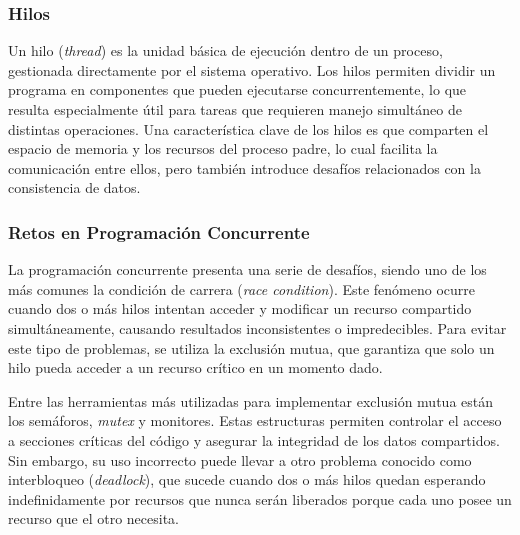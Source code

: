 \subsubsection{Hilos}
Un hilo (\textit{thread}) es la unidad básica de ejecución dentro de un proceso, gestionada directamente por el sistema operativo. Los hilos permiten dividir un programa en componentes que pueden ejecutarse concurrentemente, lo que resulta especialmente útil para tareas que requieren manejo simultáneo de distintas operaciones. Una característica clave de los hilos es que comparten el espacio de memoria y los recursos del proceso padre, lo cual facilita la comunicación entre ellos, pero también introduce desafíos relacionados con la consistencia de datos.



\subsubsection{Retos en Programación Concurrente}
La programación concurrente presenta una serie de desafíos, siendo uno de los más comunes la condición de carrera (\textit{race condition}). Este fenómeno ocurre cuando dos o más hilos intentan acceder y modificar un recurso compartido simultáneamente, causando resultados inconsistentes o impredecibles. Para evitar este tipo de problemas, se utiliza la exclusión mutua, que garantiza que solo un hilo pueda acceder a un recurso crítico en un momento dado.

Entre las herramientas más utilizadas para implementar exclusión mutua están los semáforos, \textit{mutex} y monitores. Estas estructuras permiten controlar el acceso a secciones críticas del código y asegurar la integridad de los datos compartidos. 
Sin embargo, su uso incorrecto puede llevar a otro problema conocido como interbloqueo (\textit{deadlock}), que sucede cuando dos o más hilos quedan esperando indefinidamente por recursos que nunca serán liberados porque cada uno posee un recurso que el otro necesita. 


